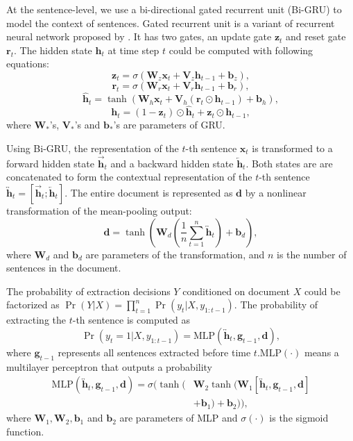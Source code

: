 \documentclass[letterpaper]{article} %
\begin{document}
	At the sentence-level, we use a bi-directional gated recurrent unit (Bi-GRU) to model the context of sentences. Gated recurrent unit is a variant of recurrent neural network proposed by \cite{chung2014empirical}. It has two gates, an update gate $\mathbf{z}_t$ and reset gate $\mathbf{r}_t$. The hidden state $\mathbf{h}_t$ at time step $t$ could be computed with following equations:
	\[ \mathbf{z}_t = \sigma(\mathbf{W}_{z} \mathbf{x}_t + \mathbf{V}_{z} \mathbf{h}_{t-1}  + \mathbf{b}_{z}) , \]
	\[ \mathbf{r}_t = \sigma(\mathbf{W}_{r} \mathbf{x}_t + \mathbf{V}_{r} \mathbf{h}_{t-1}  + \mathbf{b}_{r}) , \]
	\[ \hat{\mathbf{h}}_t = \tanh(\mathbf{W}_{h} \mathbf{x}_t + \mathbf{V}_{h} (\mathbf{r}_{t} \odot \mathbf{h}_{t-1} ) + \mathbf{b}_{h} ) ,\]
	\[ \mathbf{h}_t = (1 - \mathbf{z}_t) \odot \hat{\mathbf{h}}_{t} +  \mathbf{z}_t \odot \mathbf{h}_{t-1} ,\]
	where $\mathbf{W}_{*}$'s, $\mathbf{V}_{*}$'s and $\mathbf{b}_{*}$'s are parameters of GRU. 
	
	Using Bi-GRU, the representation of the $t$-th sentence $\mathbf{x}_t$ is transformed to a forward hidden state $\overrightarrow{\mathbf{h}}_t$ and a backward hidden state $\overleftarrow{\mathbf{h}}_t$. Both states are are concatenated to form the contextual representation of the $t$-th sentence $\overleftrightarrow{\mathbf{h}}_t = [\overrightarrow{\mathbf{h}}_t ; \overleftarrow{\mathbf{h}}_t]$. The entire document is represented as $\mathbf{d}$ by a nonlinear transformation of the mean-pooling output:
	\[ \mathbf{d} = \tanh( \mathbf{W}_d (\frac{1}{n} \sum_{t=1}^{n} \overleftrightarrow{\mathbf{h}}_t ) + \mathbf{b}_d ) ,\]
	where $\mathbf{W}_d$ and $\mathbf{b}_d$ are parameters of the transformation, and $n$ is the number of sentences in the document. 
	
	The probability of extraction decisions $Y$ conditioned on document $X$ could be factorized as $\Pr(Y|X) = \prod_{t=1}^{n} \Pr(y_t | X, y_{1:t-1})$.
	The probability of extracting the $t$-th sentence is computed as
	\begin{equation} \label{eq:mlp}
		 \Pr(y_t=1|X, y_{1:t-1}) = \text{MLP}(\overleftrightarrow{\mathbf{h}}_t, \mathbf{g}_{t-1}, \mathbf{d} ) ,
	\end{equation}
	where $\mathbf{g}_{t-1}$ represents all sentences extracted before time $t$.$\text{MLP}(\cdot)$ means a multilayer perceptron that outputs a probability
	\begin{align*}
	\text{MLP}(\overleftrightarrow{\mathbf{h}}_t, \mathbf{g}_{t-1}, \mathbf{d} ) =  \sigma( \tanh ( & \mathbf{W}_2 \tanh(\mathbf{W}_1 [\overleftrightarrow{\mathbf{h}}_t, \mathbf{g}_{t-1}, \mathbf{d}] \\
	& + \mathbf{b}_1) + \mathbf{b}_2) ),
	\end{align*}
	where $\mathbf{W}_{1},\mathbf{W}_{2}, \mathbf{b}_{1}$ and $\mathbf{b}_{2}$ are parameters of MLP and $\sigma(\cdot)$ is the sigmoid function. 
	
\end{document}
